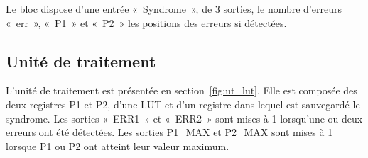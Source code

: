 \documentclass[a4paper, 11pt, svgnames]{report}
\begin{document}
            Le bloc dispose d'une entrée «~Syndrome~», de 3 sorties, le nombre
            d'erreurs «~err~», «~P1~» et «~P2~» les positions des erreurs si
            détectées.

            \subsection{Unité de traitement}
                L'unité de traitement est présentée en section~\ref{fig:ut_lut}.
                Elle est composée des deux registres P1 et P2, d'une LUT et
                d'un registre dans lequel est sauvegardé le syndrome.  Les
                sorties «~ERR1~» et «~ERR2~» sont mises à 1 lorsqu'une ou deux
                erreurs ont été détectées. Les sorties P1\_MAX et P2\_MAX sont
                mises à 1 lorsque P1 ou P2 ont atteint leur valeur maximum.
\end{document}
